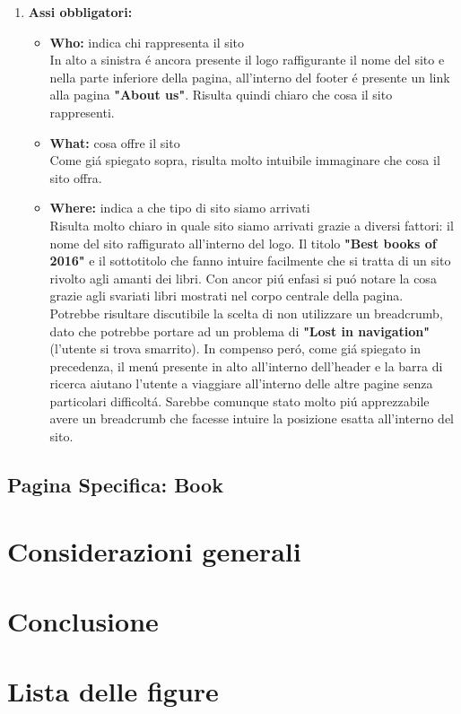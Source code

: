 \documentclass[12pt]{article}
\begin{document}
\begin{enumerate}
\item {\large \textbf{Assi obbligatori:}}
	\begin{itemize}
		\item \textbf{Who:} indica chi rappresenta il sito\\
		In alto a sinistra \'e ancora presente il logo raffigurante il nome del sito e nella parte inferiore della pagina, all'interno del footer \'e presente un link alla pagina \textbf{"About us"}. Risulta quindi chiaro che cosa il sito rappresenti.
		\item \textbf{What:} cosa offre il sito\\
		Come gi\'a spiegato sopra, risulta molto intuibile immaginare che cosa il sito offra.
		\item \textbf{Where:} indica a che tipo di sito siamo arrivati\\
		Risulta molto chiaro in quale sito siamo arrivati grazie a diversi fattori: il nome del sito raffigurato all'interno del logo. Il titolo \textbf{"Best books of 2016"} e il sottotitolo che fanno intuire facilmente che si tratta di un sito rivolto agli amanti dei libri. Con ancor pi\'u enfasi si pu\'o notare la cosa grazie agli svariati libri mostrati nel corpo centrale della pagina.\\
		Potrebbe risultare discutibile la scelta di non utilizzare un breadcrumb, dato che potrebbe portare ad un problema di \textbf{"Lost in navigation"} (l'utente si trova smarrito). In compenso per\'o, come gi\'a spiegato in precedenza, il men\'u presente in alto all'interno dell'header e la barra di ricerca aiutano l'utente a viaggiare all'interno delle altre pagine senza particolari difficolt\'a. Sarebbe comunque stato molto pi\'u apprezzabile avere un breadcrumb che facesse intuire la posizione esatta all'interno del sito.
	\end{itemize}	

\end{enumerate}


\subsection{Pagina Specifica: Book}

\section{Considerazioni generali}

\section{Conclusione}

\section{Lista delle figure}
\end{document}
